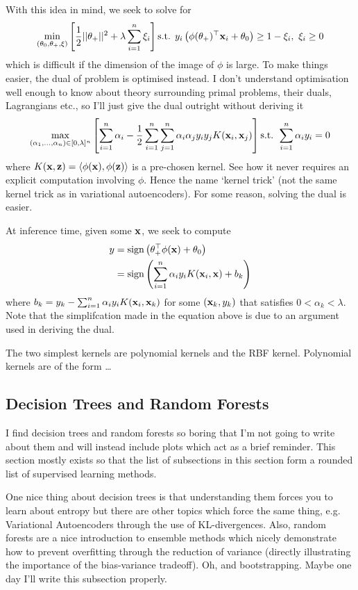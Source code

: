\documentclass[11pt]{article}
\begin{document}
With this idea in mind, we seek to solve for
$$
\min_{(\theta_0,\theta_+,\xi)}\left[\frac{1}{2}||\theta_+||^2+\lambda\sum_{i=1}^n\xi_i\right]\text{s.t. } y_i\left(\phi(\theta_+)^\top\mathbf{x}_i+\theta_0\right)\geq 1-\xi_i,\text{ }\xi_i\geq0
$$
which is difficult if the dimension of the image of $\phi$ is large. To make things easier, the dual of problem is optimised instead. I don't understand optimisation well enough to know about theory surrounding primal problems, their duals, Lagrangians etc., so I'll just give the dual outright without deriving it
$$
\max_{(\alpha_1,\dots,\alpha_n)\in[0,\lambda]^n}\left[\sum_{i=1}^n\alpha_i-\frac{1}{2}\sum_{i=1}^n\sum_{j=1}^n\alpha_i\alpha_jy_iy_jK(\mathbf{x}_i,\mathbf{x}_j)\right]\text{s.t. }\sum_{i=1}^n\alpha_iy_i=0
$$
where $K(\mathbf{x},\mathbf{z})=\langle\phi(\mathbf{x}),\phi(\mathbf{z})\rangle$ is a pre-chosen kernel. See how it never requires an explicit computation involving $\phi$. Hence the name `kernel trick' (not the same kernel trick as in variational autoencoders). For some reason, solving the dual is easier. 

At inference time, given some $\mathbf{x}$, we seek to compute
\begin{align*}
    y
    &=
    \text{sign}\left(\theta_+^\top\phi(\mathbf{x})+\theta_0\right)\\
    &=
    \text{sign}\left(\sum_{i=1}^n\alpha_iy_iK(\mathbf{x}_i,\mathbf{x})+b_k\right)
\end{align*}
where $b_k=y_k-\sum_{i=1}^n\alpha_iy_iK(\mathbf{x}_i,\mathbf{x}_k)$ for some $(\mathbf{x}_k,y_k)$ that satisfies $0<\alpha_k<\lambda$. Note that the simplifcation made in the equation above is due to an argument used in deriving the dual.

The two simplest kernels are polynomial kernels and the RBF kernel. Polynomial kernels are of the form \dots

\subsection{Decision Trees and Random Forests}
I find decision trees and random forests so boring that I'm not going to write about them and will instead include plots which act as a brief reminder. This section mostly exists so that the list of subsections in this section form a rounded list of supervised learning methods. 


One nice thing about decision trees is that understanding them forces you to learn about entropy but there are other topics which force the same thing, e.g. Variational Autoencoders through the use of KL-divergences. Also, random forests are a nice introduction to ensemble methods which nicely demonstrate how to prevent overfitting through the reduction of variance (directly illustrating the importance of the bias-variance tradeoff). Oh, and bootstrapping. Maybe one day I'll write this subsection properly.
\end{document}
